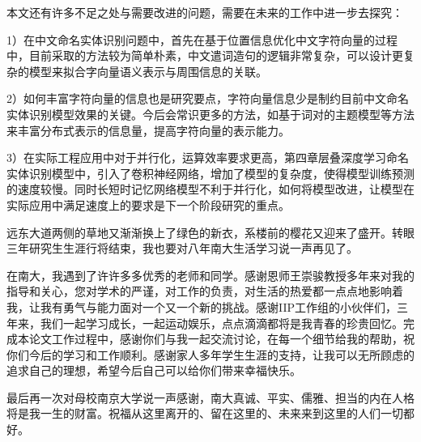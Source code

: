 \documentclass[winfonts,master,oneside,nobackinfo]{njuthesis}
\begin{document}
本文还有许多不足之处与需要改进的问题，需要在未来的工作中进一步去探究：

1）在中文命名实体识别问题中，首先在基于位置信息优化中文字符向量的过程中，目前采取的方法较为简单朴素，中文遣词造句的逻辑非常复杂，可以设计更复杂的模型来拟合字向量语义表示与周围信息的关联。

2）如何丰富字符向量的信息也是研究要点，字符向量信息少是制约目前中文命名实体识别模型效果的关键。今后会常识更多的方法，如基于词对的主题模型等方法来丰富分布式表示的信息量，提高字符向量的表示能力。

3）在实际工程应用中对于并行化，运算效率要求更高，第四章层叠深度学习命名实体识别模型中，引入了卷积神经网络，增加了模型的复杂度，使得模型训练预测的速度较慢。同时长短时记忆网络模型不利于并行化，如何将模型改进，让模型在实际应用中满足速度上的要求是下一个阶段研究的重点。




\begin{acknowledgement}

远东大道两侧的草地又渐渐换上了绿色的新衣，系楼前的樱花又迎来了盛开。转眼三年研究生生涯行将结束，我也要对八年南大生活学习说一声再见了。

在南大，我遇到了许许多多优秀的老师和同学。感谢恩师王崇骏教授多年来对我的指导和关心，您对学术的严谨，对工作的负责，对生活的热爱都一点点地影响着我，让我有勇气与能力面对一个又一个新的挑战。感谢IIP工作组的小伙伴们，三年来，我们一起学习成长，一起运动娱乐，点点滴滴都将是我青春的珍贵回忆。完成本论文工作过程中，感谢你们与我一起交流讨论，在每一个细节给我的帮助，祝你们今后的学习和工作顺利。感谢家人多年学生生涯的支持，让我可以无所顾虑的追求自己的理想，希望今后自己可以给你们带来幸福快乐。

最后再一次对母校南京大学说一声感谢，南大真诚、平实、儒雅、担当的内在人格将是我一生的财富。祝福从这里离开的、留在这里的、未来来到这里的人们一切都好。

\end{acknowledgement}






\end{document}
